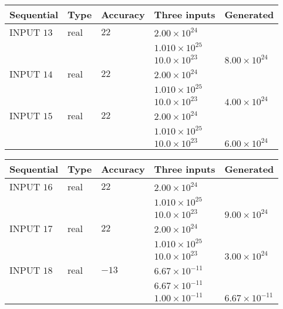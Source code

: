 \documentclass[12pt]{article}
\begin{document}
   
  
  
\noindent\begin{tabular}{|l|l|l|l|l|}
\hline
 Sequential & Type & Accuracy & Three inputs & Generated \\ 
\hline
 
 
  INPUT $          13$ & real & $          22 $ & $
 2.00 \times 10^{24}
  $ & \\
  & & &  $
 1.010 \times 10^{25}
  $ & \\
  & & &  $
 10.0 \times 10^{23}
 $ & $ 8.00 \times 10^{24} $ 
 \\  \hline  
 
 
  INPUT $          14$ & real & $          22 $ & $
 2.00 \times 10^{24}
  $ & \\
  & & &  $
 1.010 \times 10^{25}
  $ & \\
  & & &  $
 10.0 \times 10^{23}
 $ & $ 4.00 \times 10^{24} $ 
 \\  \hline  
 
 
  INPUT $          15$ & real & $          22 $ & $
 2.00 \times 10^{24}
  $ & \\
  & & &  $
 1.010 \times 10^{25}
  $ & \\
  & & &  $
 10.0 \times 10^{23}
 $ & $ 6.00 \times 10^{24} $ 
 \\  \hline  
 \end{tabular}
   
   
  
  
\noindent\begin{tabular}{|l|l|l|l|l|}
\hline
 Sequential & Type & Accuracy & Three inputs & Generated \\ 
\hline
 
 
  INPUT $          16$ & real & $          22 $ & $
 2.00 \times 10^{24}
  $ & \\
  & & &  $
 1.010 \times 10^{25}
  $ & \\
  & & &  $
 10.0 \times 10^{23}
 $ & $ 9.00 \times 10^{24} $ 
 \\  \hline  
 
 
  INPUT $          17$ & real & $          22 $ & $
 2.00 \times 10^{24}
  $ & \\
  & & &  $
 1.010 \times 10^{25}
  $ & \\
  & & &  $
 10.0 \times 10^{23}
 $ & $ 3.00 \times 10^{24} $ 
 \\  \hline  
 
 
  INPUT $          18$ & real & $         -13 $ & $
 6.67 \times 10^{-11}
  $ & \\
  & & &  $
 6.67 \times 10^{-11}
  $ & \\
  & & &  $
 1.00 \times 10^{-11}
 $ & $ 6.67 \times 10^{-11} $ 
 \\  \hline  
 \end{tabular}
   
\end{document}
